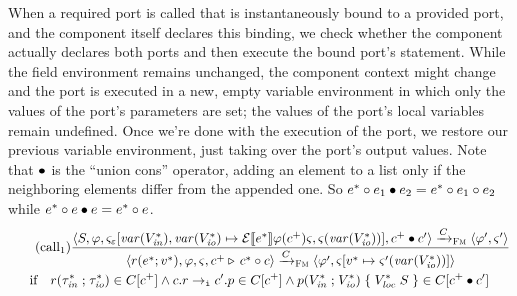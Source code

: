 \documentclass[a4paper,10pt,english]{article}
\begin{document}
When a required port is called that is instantaneously bound to a provided port, and the component itself
declares this binding, we check whether the component actually declares both ports and then execute the bound port's statement.
While the field environment remains unchanged, the component context might change and the port is executed in a new, empty
variable environment in which only the values of the port's parameters are set; the values of the port's local variables remain undefined. Once we're
done with the execution of the port, we restore our previous variable environment, just taking over the port's output values.
Note that $\bullet$ is the ``union cons'' operator, adding an element to a list only if the neighboring elements
differ from the appended one. So $e^* \circ e_1 \bullet e_2 = e^* \circ e_1 \circ e_2$ while $e^* \circ e \bullet e =
e^* \circ e$.
\begin{multline*}
	\tag{call${}_1$}
	\dfrac
	{
		\configurationFm{\stmFm, \fieldEnv, \varEnvFm_\missing[\varof(\toList{\varDecl}_\mathit{in}), \varof(\toList{\varDecl}_\mathit{io}) \mapsto
		\ExprSem{\toList{\expr}}\fieldEnv(\toListNE{\comp})\varEnvFm, \varEnvFm(\varof(\toList{\varDecl}_\mathit{io}))],
		\toListNE{\comp} \unionCons \comp'}
			\stmArrowFm
		\configurationFm{\fieldEnv', \varEnvFm'}
	}
	{
		\configurationFm{\invoke{\reqPort}{\toList{\expr}}{\toList{\var}}, \fieldEnv, \varEnvFm, \toListNE{\comp}
		\triangleright \, \toList{\comp} \cons \comp}
			\stmArrowFm
		\configurationFm{\fieldEnv', \varEnvFm[\toList{\var} \mapsto \varEnvFm'(\varof(\toList{\varDecl_\mathit{io}}))]}
	}
	\\ \text{if} \quad \reqPortDeclSyn{\reqPort}{\toList{\type_\mathit{in}}}{\toList{\type_\mathit{io}}} \in
		\compDecl[\toListNE{\comp}] 
	\wedge 
	\bindingDeclSyn{\qualifiedName{\comp}{\reqPort}}{\qualifiedName{\comp'}{\provPort}}{\instantBinding} \in
		\compDecl[\toListNE{\comp}]
	\wedge
	\provPortDeclSyn{\provPort}{\toList{\varDecl_\mathit{in}}}{\toList{\varDecl_\mathit{io}}}{\toList{\varDecl_\mathit{loc}}}{\stmFm}
	\in	\compDecl[\toListNE{\comp} \unionCons \comp']
\end{multline*}
\end{document}
